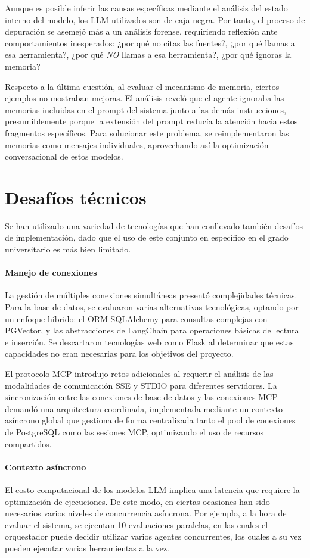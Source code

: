 Aunque es posible inferir las causas específicas mediante el análisis del estado interno del modelo, los LLM utilizados son de caja negra. Por tanto, el proceso de depuración se asemejó más a un análisis forense, requiriendo reflexión ante comportamientos inesperados: ¿por qué no citas las fuentes?, ¿por qué llamas a esa herramienta?, ¿por qué \textit{NO} llamas a esa herramienta?, ¿por qué ignoras la memoria?

Respecto a la última cuestión, al evaluar el mecanismo de memoria, ciertos ejemplos no mostraban mejoras. El análisis reveló que el agente ignoraba las memorias incluidas en el prompt del sistema junto a las demás instrucciones, presumiblemente porque la extensión del prompt reducía la atención hacia estos fragmentos específicos. Para solucionar este problema, se reimplementaron las memorias como mensajes individuales, aprovechando así la optimización conversacional de estos modelos.

\section{Desafíos técnicos}
Se han utilizado una variedad de tecnologías que han conllevado también desafíos de implementación, dado que el uso de este conjunto en específico en el grado universitario es más bien limitado.

\paragraph{Manejo de conexiones}
La gestión de múltiples conexiones simultáneas presentó complejidades técnicas. Para la base de datos, se evaluaron varias alternativas tecnológicas, optando por un enfoque híbrido: el ORM SQLAlchemy para consultas complejas con PGVector, y las abstracciones de LangChain para operaciones básicas de lectura e inserción. Se descartaron tecnologías web como Flask al determinar que estas capacidades no eran necesarias para los objetivos del proyecto.

El protocolo MCP introdujo retos adicionales al requerir el análisis de las modalidades de comunicación SSE y STDIO para diferentes servidores. La sincronización entre las conexiones de base de datos y las conexiones MCP demandó una arquitectura coordinada, implementada mediante un contexto asíncrono global que gestiona de forma centralizada tanto el pool de conexiones de PostgreSQL como las sesiones MCP, optimizando el uso de recursos compartidos.

\paragraph{Contexto asíncrono}
El costo computacional de los modelos LLM implica una latencia que requiere la optimización de ejecuciones. De este modo, en ciertas ocasiones han sido necesarios varios niveles de concurrencia asíncrona. Por ejemplo, a la hora de evaluar el sistema, se ejecutan 10 evaluaciones paralelas, en las cuales el orquestador puede decidir utilizar varios agentes concurrentes, los cuales a su vez pueden ejecutar varias herramientas a la vez. 

